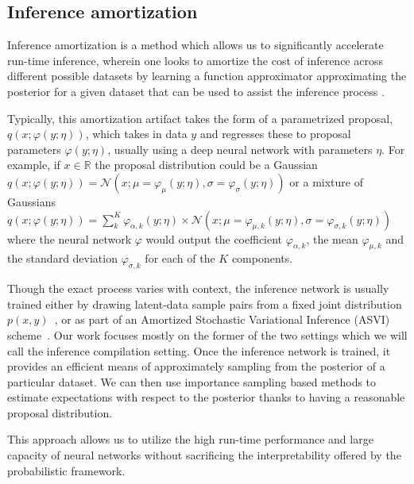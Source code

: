 \documentclass[12pt]{article}
\begin{document}
\subsection{Inference amortization}

Inference amortization is a method which allows us to significantly accelerate run-time inference, wherein one looks to amortize the cost of inference across different possible datasets
by learning a
function approximator approximating the posterior for a given dataset
that can be used to assist the inference process
\citep{StuhlmullerEtAl2013, VAE, RitchieEtAl2016, PaigeWood2016, LeEtAl2016, LeEtAl2017, FIVO, NaessethEtAl2017}.

Typically, this amortization
artifact takes the form of a parametrized proposal, $q(x ; \varphi(y; \eta))$, which takes
in data $y$ and regresses these to proposal parameters $\varphi(y; \eta)$, usually using
a deep neural network with parameters $\eta$.
For example, if $x \in \mathbb{R}$ 
the proposal distribution could be a Gaussian 
$q(x ; \varphi(y; \eta)) = \mathcal{N}(x;\mu=\varphi_{\mu}(y; \eta),\sigma=\varphi_{\sigma}(y; \eta))$
or a mixture of Gaussians
$q(x ; \varphi(y; \eta)) = \sum_k^K \varphi_{\alpha,k}(y; \eta) \times \mathcal{N}(x;\mu=\varphi_{\mu,k}(y; \eta),\sigma=\varphi_{\sigma,k}(y; \eta))$
where the neural network $\varphi$ would output 
the coefficient $\varphi_{\alpha,k}$,
the mean $\varphi_{\mu,k}$ and
the standard deviation $\varphi_{\sigma,k}$
for each of the $K$ components.

Though the exact process varies with context,
the inference network is usually trained either by drawing latent-data
sample pairs from a fixed joint distribution
$p(x,y)$~\citep{RitchieEtAl2016,PaigeWood2016,LeEtAl2016}, or 
as part of an Amortized Stochastic Variational Inference (ASVI) scheme~\citep{HoffmanEtAl2013,VAE,RezendeEtAl2014}.
Our work focuses mostly on the former of the two settings which we will call the inference compilation setting.
Once the inference network is trained, it provides an efficient means of approximately
sampling from the posterior of a particular dataset.
We can then use importance sampling based methods to estimate expectations
with respect to the posterior thanks to having a reasonable proposal distribution.

This approach allows us to utilize the high run-time performance and large capacity of neural networks 
without sacrificing the interpretability offered by the probabilistic framework.
 
\end{document}
